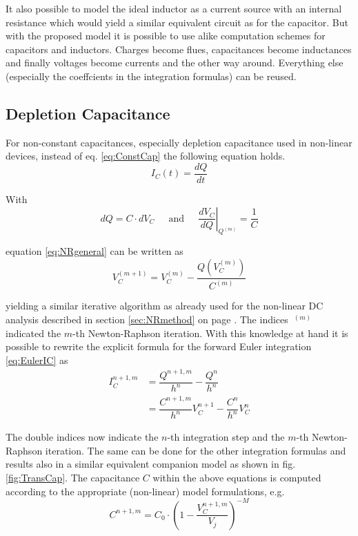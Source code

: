 \documentclass[10pt]{report}
\begin{document}
It also possible to model the ideal inductor as a current source with
an internal resistance which would yield a similar equivalent circuit
as for the capacitor.  But with the proposed model it is possible to
use alike computation schemes for capacitors and inductors.  Charges
become flues, capacitances become inductances and finally voltages
become currents and the other way around.  Everything else (especially
the coeffcients in the integration formulas) can be reused.

\subsection{Depletion Capacitance}

For non-constant capacitances, especially depletion capacitance used
in non-linear devices, instead of eq. \eqref{eq:ConstCap} the
following equation holds.
\begin{equation}
I_C(t) = \dfrac{d Q}{d t}
\end{equation}

With
\begin{equation}
d Q = C\cdot d V_C
\;\;\;\; \textrm{ and } \;\;\;\;
\left.\dfrac{d V_C}{d Q}\right|_{Q^{(m)}} = \dfrac{1}{C}
\end{equation}

equation \eqref{eq:NRgeneral} can be written as
\begin{equation}
V_C^{(m + 1)} = V_C^{(m)} - \dfrac{Q\left(V_C^{(m)}\right)}{C^{(m)}}
\end{equation}

yielding a similar iterative algorithm as already used for the
non-linear DC analysis described in section \ref{sec:NRmethod} on page
\pageref{sec:NRmethod}.  The indices $~^{(m)}$ indicated the $m$-th
Newton-Raphson iteration.  With this knowledge at hand it is possible
to rewrite the explicit formula for the forward Euler integration
\eqref{eq:EulerIC} as
\begin{equation}
\begin{split}
I_C^{n+1,m} &= \dfrac{Q^{n+1,m}}{h^{n}} - \dfrac{Q^{n}}{h^{n}}\\
&= \dfrac{C^{n+1,m}}{h^{n}} V_C^{n+1} - \dfrac{C^{n}}{h^{n}} V_C^{n}
\end{split}
\end{equation}

The double indices now indicate the $n$-th integration step and the
$m$-th Newton-Raphson iteration.  The same can be done for the other
integration formulas and results also in a similar equivalent
companion model as shown in fig. \ref{fig:TransCap}.  The capacitance
$C$ within the above equations is computed according to the
appropriate (non-linear) model formulations, e.g.
\begin{equation}
C^{n+1,m} = C_{0}\cdot \left(1 - \dfrac{V_{C}^{n+1,m}}{V_{j}}\right)^{-M}
\end{equation}
\end{document}
